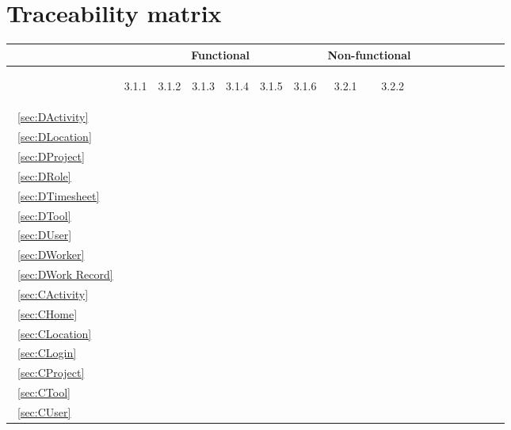 \documentclass[12pt]{article}
\renewcommand{\c}{\checkmark}
\newcommand{\s}[1] {\begin{sideways}#1\end{sideways}}
\begin{document}
\section{Traceability matrix}
\begin{center}
\begin{tabular}{|l||*{12}{c|}|*{4}{c|}}
\hline
\multicolumn{1}{|c||}{ }&
\multicolumn{6}{|c||}{Functional} &
\multicolumn{2}{|c|}{Non-functional}\\
\hline
	& \s{3.1.1} & \s{3.1.2}&\s{3.1.3}&\s{3.1.4}&\s{3.1.5}&\s{3.1.6}&\s{3.2.1}&\s{3.2.2} \\
\hline
~\ref{sec:DActivity}	&&&&&&&&\\
~\ref{sec:DLocation}	&&&&&&&&\\
~\ref{sec:DProject}		&&&&&&&&\\
~\ref{sec:DRole}		&\c&&&&&&&\\
~\ref{sec:DTimesheet}	&&&&&&&&\\
~\ref{sec:DTool}		&&&&&&&&\\
~\ref{sec:DUser}		&\c&&&&&&&\\
~\ref{sec:DWorker}		&\c&&&&&&&\\
~\ref{sec:DWork Record}	&&&&&&&&\\
\hline
~\ref{sec:CActivity}	&&&&&&&&\\
~\ref{sec:CHome}		&&&&&&&&\\
~\ref{sec:CLocation}	&&&&&&&&\\
~\ref{sec:CLogin}		&\c&&&&&&&\\
~\ref{sec:CProject}		&&&&&&&&\\
~\ref{sec:CTool}		&&&&&&&&\\
~\ref{sec:CUser}		&\c&&&&&&&\\
\hline
\end{tabular}
\end{center}
\end{document}
